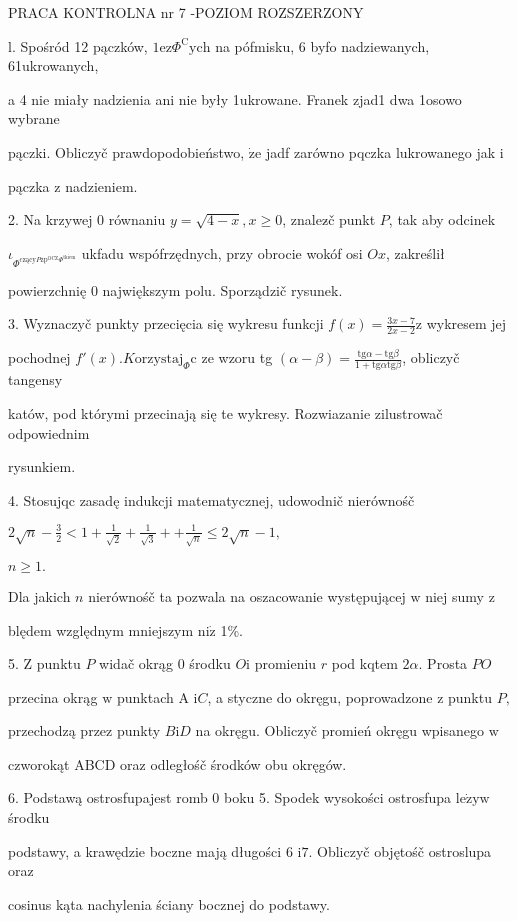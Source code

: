 \documentclass[a4paper,12pt]{article}
\begin{document}
PRACA KONTROLNA nr 7 -POZIOM ROZSZERZONY

l. Spośród 12 pączków, $1\mathrm{e}\mathrm{z}\Phi^{\mathrm{C}}\mathrm{y}\mathrm{c}\mathrm{h}$ na pófmisku, 6 byfo nadziewanych, 61ukrowanych,

a 4 nie miały nadzienia ani nie były 1ukrowane. Franek zjad1 dwa 1osowo wybrane

pączki. Obliczyč prawdopodobieństwo, $\dot{\mathrm{z}}\mathrm{e}$ jadf zarówno pqczka lukrowanego jak $\mathrm{i}$

pączka $\mathrm{z}$ nadzieniem.

2. Na krzywej $0$ równaniu $y = \sqrt{4-x}, x \geq 0$, znalez$\acute{}$č punkt $P$, tak aby odcinek

$\iota_{\Phi^{\mathrm{c}\mathrm{z}\text{ą} \mathrm{c}\mathrm{y}P\mathrm{z}\mathrm{p}^{\mathrm{O}\mathrm{C}\mathrm{Z}}\Phi^{\mathrm{t}\mathrm{k}\mathrm{i}\mathrm{e}\mathrm{m}}}}$ ukfadu wspófrzędnych, przy obrocie wokóf osi $Ox$, zakreślił

powierzchnię $0$ największym polu. Sporządzič rysunek.

3. Wyznaczyč punkty przecięcia się wykresu funkcji $f(x) = \displaystyle \frac{3x-7}{2x-2} \mathrm{z}$ wykresem jej

pochodnej $f'(x). K\mathrm{o}\mathrm{r}\mathrm{z}\mathrm{y}\mathrm{s}\mathrm{t}\mathrm{a}\mathrm{j}_{\Phi}\mathrm{c}$ ze wzoru tg $(\displaystyle \alpha-\beta)=\frac{\mathrm{t}\mathrm{g}\alpha-\mathrm{t}\mathrm{g}\beta}{1+\mathrm{t}\mathrm{g}\alpha \mathrm{t}\mathrm{g}\beta}$, obliczyč tangensy

katów, pod którymi przecinają się te wykresy. Rozwiazanie zilustrowač odpowiednim

rysunkiem.

4. Stosujqc zasadę indukcji matematycznej, udowodnič nierównośč

$2\displaystyle \sqrt{n}-\frac{3}{2}<1+\frac{1}{\sqrt{2}}+\frac{1}{\sqrt{3}}+ +\displaystyle \frac{1}{\sqrt{n}}\leq 2\sqrt{n}-1,$

$n\geq 1.$

Dla jakich $n$ nierównośč ta pozwala na oszacowanie występującej $\mathrm{w}$ niej sumy $\mathrm{z}$

blędem względnym mniejszym $\mathrm{n}\mathrm{i}\dot{\mathrm{z}}$ 1\%.

5. $\mathrm{Z}$ punktu $P$ widač okrąg $0$ środku $O \mathrm{i}$ promieniu $r$ pod kqtem $ 2\alpha$. Prosta $PO$

przecina okrąg $\mathrm{w}$ punktach A $\mathrm{i}C$, a styczne do okręgu, poprowadzone $\mathrm{z}$ punktu $P,$

przechodzą przez punkty $B\mathrm{i}D$ na okręgu. Obliczyč promień okręgu wpisanego $\mathrm{w}$

czworokąt ABCD oraz odległośč środków obu okręgów.

6. Podstawą ostrosfupajest romb $0$ boku 5. Spodek wysokości ostrosfupa $\mathrm{l}\mathrm{e}\dot{\mathrm{z}}\mathrm{y}\mathrm{w}$ środku

podstawy, a krawędzie boczne mają długości 6 $\mathrm{i}7$. Obliczyč objętośč ostroslupa oraz

cosinus kąta nachylenia ściany bocznej do podstawy.
\end{document}
